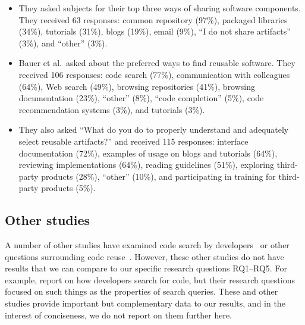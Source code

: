 \documentclass[review]{elsarticle}
\begin{document}
\begin{itemize}

\item They asked subjects for their top three ways of sharing software components.  They received 63 responses: common repository (97\%), packaged libraries (34\%), tutorials (31\%), blogs (19\%), email (9\%), ``I do not share artifacts'' (3\%), and ``other'' (3\%).

\item Bauer et al.\ asked about the preferred ways to find reusable software.  They received 106 responses: code search (77\%), communication with colleagues (64\%), Web search (49\%), browsing repositories (41\%), browsing documentation (23\%), ``other'' (8\%), ``code completion'' (5\%), code recommendation systems (3\%), and tutorials (3\%).

\item They also asked ``What do you do to properly understand and adequately select reusable artifacts?'' and received 115 responses: interface documentation (72\%), examples of usage on blogs and tutorials (64\%), reviewing implementations (64\%), reading guidelines (51\%), exploring third-party products (28\%), ``other'' (10\%), and participating in training for third-party products (5\%).

\end{itemize}



\subsection{Other studies}

A number of other studies have examined code search by developers~\citep[e.g.,][]{sim2012software, gallardo2011kinds, singer1997examination, sadowski2015developers, xia2017what} or other questions surrounding code reuse~\cite[e.g.,][]{sojer2010code, frakes1995sixteen, morisio2002success}.  However, these other studies do not have results that we can compare to our specific research questions RQ1--RQ5.  For example, \citet{sadowski2015developers} report on how developers search for code, but their research questions focused on such things as the properties of search queries.  These and other studies provide important but complementary data to our results, and in the interest of conciseness, we do not report on them further here.
\end{document}
